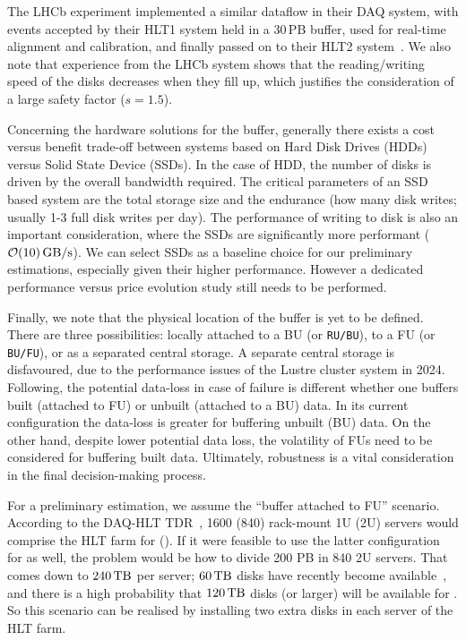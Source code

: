 The LHCb experiment implemented a similar dataflow in their DAQ system, with events accepted by their HLT1 system held in a 30\,PB buffer, used for real-time alignment and calibration, and finally passed on to their HLT2 system~\cite{LHCb:2023hlw}. We also note that experience from the LHCb system shows that the reading/writing speed of the disks decreases when they fill up, which justifies the consideration of a large safety factor ($s = 1.5$).

Concerning the hardware solutions for the buffer, generally there exists a cost versus benefit trade-off between systems based on Hard Disk Drives (HDDs) versus Solid State Device (SSDs). In the case of HDD, the number of disks is driven by the overall bandwidth required. The critical parameters of an SSD based system are the total storage size and the endurance (how many disk writes; usually 1-3 full disk writes per day). The performance of writing to disk is also an important consideration, where the SSDs are significantly more performant ($\mathcal{O}(10)\,\text{GB/s}$). We can select SSDs as a baseline choice for our preliminary estimations, especially given their higher performance. However a dedicated performance versus price evolution study still needs to be performed.

Finally, we note that the physical location of the buffer is yet to be defined. There are three possibilities: 
locally attached to a BU (or \texttt{RU/BU}), to a FU (or \texttt{BU/FU}), or as a separated central storage. A separate central storage is disfavoured, due to the performance issues of the Lustre cluster system in 2024. Following, the potential data-loss in case of failure is different whether one buffers built (attached to FU) or unbuilt (attached to a BU) data. In its current configuration the data-loss is greater for buffering unbuilt (BU) data. On the other hand, despite lower potential data loss, the volatility of FUs need to be considered for buffering built data. Ultimately, robustness is a vital consideration in the final decision-making process.

For a preliminary estimation, we assume the ``buffer attached to FU'' scenario.
According to the DAQ-HLT TDR~\cite{Collaboration:2759072},
1600 (840) rack-mount 1U (2U) servers would comprise the HLT farm for \Runfour (\Runfive).
If it were feasible to use the latter configuration for \Runfour as well,
the problem would be how to divide 200 PB in 840 2U servers.
That comes down to  $240\,\text{TB}$ per server; $60\,\text{TB}$ disks have recently become available~\cite{micron60tb},
and there is a high probability that $120\,\text{TB}$ disks (or larger) will be available for \Runfour. So this scenario can be realised by installing two extra disks in each server of the HLT farm.

